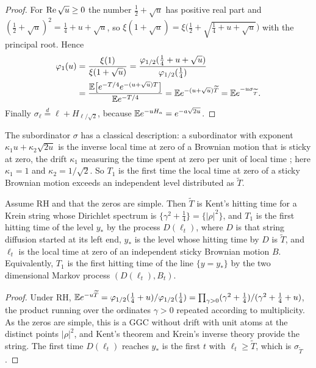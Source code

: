 \begin{proof}
For $\operatorname{Re}\sqrt u\ge0$ the number $\frac12+\sqrt u$ has positive real part and $(\frac12+\sqrt u)^2=\frac14+u+\sqrt u$, so $\xi(1+\sqrt u)=\xi\big(\frac12+\sqrt{\tfrac14+u+\sqrt u}\big)$ with the principal root. Hence
\[
\begin{aligned}
\varphi_1(u)&=\frac{\xi(1)}{\xi(1+\sqrt u)}=\frac{\varphi_{1/2}(\frac14+u+\sqrt u)}{\varphi_{1/2}(\frac14)}\\
&=\frac{\mathbb{E}\big[e^{-T/4}e^{-(u+\sqrt u)T}\big]}{\mathbb{E} e^{-T/4}}=\mathbb{E} e^{-(u+\sqrt u)\widetilde T}=\mathbb{E} e^{-u\sigma_{\widetilde T}} .
\end{aligned}
\]
Finally $\sigma_\ell\stackrel{d}{=}\ell+H_{\ell/\sqrt2}$, because $\mathbb{E} e^{-uH_a}=e^{-a\sqrt{2u}}$.
\end{proof}

The subordinator $\sigma$ has a classical description: a subordinator with exponent $\kappa_1u+\kappa_2\sqrt{2u}$ is the inverse local time at zero of a Brownian motion that is sticky at zero, the drift $\kappa_1$ measuring the time spent at zero per unit of local time \cite[Section 5.7, p.~187]{ItoMcKean65}; here $\kappa_1=1$ and $\kappa_2=1/\sqrt2$. So $T_1$ is the first time the local time at zero of a sticky Brownian motion exceeds an independent level distributed as $\widetilde T$.

\begin{corollary}\label{bp:cor:kent}
Assume RH and that the zeros are simple. Then $\widetilde T$ is Kent's hitting time for a Krein string whose Dirichlet spectrum is $\{\gamma^2+\frac14\}=\{|\rho|^2\}$, and $T_1$ is the first hitting time of the level $y_*$ by the process $D(\ell_t)$, where $D$ is that string diffusion started at its left end, $y_*$ is the level whose hitting time by $D$ is $\widetilde T$, and $\ell_t$ is the local time at zero of an independent sticky Brownian motion $B$. Equivalently, $T_1$ is the first hitting time of the line $\{y=y_*\}$ by the two dimensional Markov process $(D(\ell_t),B_t)$.
\end{corollary}

\begin{proof}
Under RH, $\mathbb{E} e^{-u\widetilde T}=\varphi_{1/2}(\frac14+u)/\varphi_{1/2}(\frac14)=\prod_{\gamma>0}(\gamma^2+\frac14)/(\gamma^2+\frac14+u)$, the product running over the ordinates $\gamma>0$ repeated according to multiplicity. As the zeros are simple, this is a GGC without drift with unit atoms at the distinct points $|\rho|^2$, and Kent's theorem and Krein's inverse theory provide the string. The first time $D(\ell_t)$ reaches $y_*$ is the first $t$ with $\ell_t\ge\widetilde T$, which is $\sigma_{\widetilde T}$.
\end{proof}

